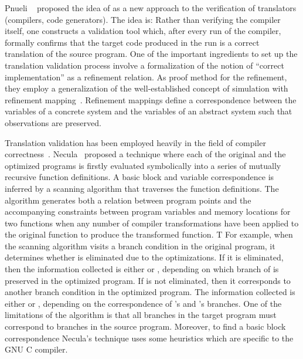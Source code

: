 Pnueli \etal~\cite{Pnueli:1998} proposed the idea of \tv as a new approach to
the verification of translators (compilers, code generators). The idea is:
Rather than verifying the compiler itself, one constructs a validation tool
which, after every run of the compiler, formally confirms that the target code
produced in the run is a correct translation of the source program. One of the
important ingredients  to set up the  translation validation process involve a
formalization of the notion of ``correct implementation'' as a refinement
relation. As proof method for the refinement, they employ a generalization of
the well-established concept of simulation with refinement
mapping~\cite{Abadi:1991}. Refinement mappings define a correspondence between
the variables of a concrete system and the variables of an abstract system such
that observations are preserved. 

Translation validation  has been employed heavily in the field of compiler
correctness~\cite{VOC2002,TVOC:CAV2005,Necula:2000}.  Necula~\cite{Necula:2000}
proposed a technique where each of the original and the optimized programs is
firstly evaluated symbolically into a series of mutually recursive function
definitions. A basic block and variable correspondence is inferred by a
scanning algorithm that traverses the function definitions. The algorithm
generates both a relation between program points and the accompanying
constraints between program variables and memory locations for two functions
when any number of compiler transformations have been applied to the original
function to produce the transformed function.  T For example, when the scanning
algorithm visits a branch condition  in the original program, it
determines whether  is eliminated due to the optimizations. If it is
eliminated, then the information collected is either  or , depending on which branch of  is preserved in the optimized program. 
%
If  is not eliminated, then it corresponds to another branch condition
 in the optimized program. The information collected is either 
or , depending on the correspondence of ’s and ’s
branches. One of the limitations of the algorithm is that all branches in the
target program must correspond to branches in the source program.   Moreover, to find
    a basic block correspondence Necula’s technique uses some heuristics which
    are specific to the GNU C compiler. 
  
